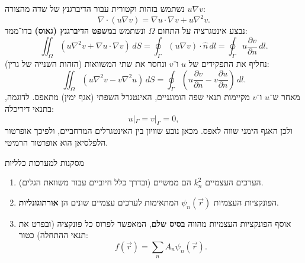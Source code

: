 נשתמש בזהות וקטורית עבור הדיברגנץ של שדה מהצורה $u \nabla v$:
\[
\nabla \cdot (u \nabla v)
=
\nabla u \cdot \nabla v
+
u \nabla^2 v .
\]
נבצע אינטגרציה על התחום $\Omega$ ונשתמש ב\textbf{משפט הדיברגנץ (גאוס)}
בדו־ממד:
\[
\iint_{\Omega}
\left(
u \nabla^2 v + \nabla u \cdot \nabla v
\right)
\, dS
=
\oint_{\Gamma}
(u \nabla v) \cdot \hat{n} \, dl
=
\oint_{\Gamma}
u \frac{\partial v}{\partial n} \, dl .
\]
נחליף את התפקידים של $u$ ו־$v$ ונחסר את שתי המשוואות
(הזהות השנייה של גרין):
\begin{equation}
\iint_{\Omega}
\left(
u \nabla^2 v - v \nabla^2 u
\right)
\, dS
=
\oint_{\Gamma}
\left(
u \frac{\partial v}{\partial n}
-
v \frac{\partial u}{\partial n}
\right)
\, dl .
\end{equation}
מאחר ש־$u$ ו־$v$ מקיימות תנאי שפה הומוגניים,
האינטגרל השפתי (אגף ימין) מתאפס.
לדוגמה, בתנאי דיריכלה:
\[
u|_{\Gamma} = v|_{\Gamma} = 0 ,
\]
ולכן האגף הימני שווה לאפס.
מכאן נובע שוויון בין האינטגרלים המרחביים,
ולפיכך אופרטור הלפלסיאן הוא אופרטור הרמיטי.
\begin{summarybox}{מסקנות למערכות כלליות}
\begin{enumerate}
    \item הערכים העצמיים $k_n^2$ הם ממשיים
    (ובדרך כלל חיוביים עבור משוואת הגלים).
    \item הפונקציות העצמיות
    $\psi_n(\vec{r})$
    המתאימות לערכים עצמיים שונים הן
    \textbf{אורתוגונליות}.
    \item אוסף הפונקציות העצמיות מהווה
    \textbf{בסיס שלם},
    המאפשר לפרוס כל פונקציה (ובפרט את תנאי ההתחלה)
    כטור:
    \[
    f(\vec{r}) = \sum_n A_n \psi_n(\vec{r}) .
    \]
\end{enumerate}
\end{summarybox}
